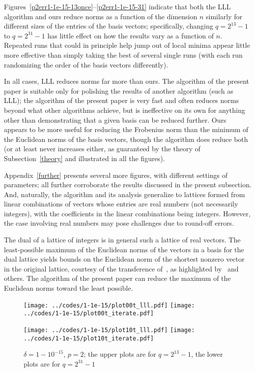 \documentclass{article}
\begin{document}
Figures~\ref{p2err1-1e-15-13once}--\ref{p2err1-1e-15-31}
indicate that both the LLL algorithm and ours reduce norms
as a function of the dimension $n$ similarly for different sizes
of the entries of the basis vectors; specifically, changing $q = 2^{13} - 1$
to $q = 2^{31} - 1$ has little effect on how the results vary
as a function of $n$. Repeated runs that could in principle help jump out
of local minima appear little more effective than simply taking the best
of several single runs (with each run randomizing the order
of the basis vectors differently).

In all cases, LLL reduces norms far more than ours.
The algorithm of the present paper is suitable only for polishing the results
of another algorithm (such as LLL); the algorithm of the present paper
is very fast and often reduces norms beyond what other algorithms achieve,
but is ineffective on its own for anything other than demonstrating
that a given basis can be reduced further.
Ours appears to be more useful for reducing the Frobenius norm
than the minimum of the Euclidean norms of the basis vectors,
though the algorithm does reduce both (or at least never increases either,
as guaranteed by the theory of Subsection~\ref{theory}
and illustrated in all the figures).

Appendix~\ref{further} presents several more figures, with different settings
of parameters; all further corroborate the results discussed
in the present subsection.
And, naturally, the algorithm and its analysis generalize to lattices formed
from linear combinations of vectors whose entries are real numbers
(not necessarily integers), with the coefficients in the linear combinations
being integers. However, the case involving real numbers may pose challenges
due to round-off errors.

The dual of a lattice of integers is in general such a lattice
of real vectors. The least-possible maximum of the Euclidean norms
of the vectors in a basis for the dual lattice yields bounds
on the Euclidean norm of the shortest nonzero vector in the original lattice,
courtesy of the transference of~\cite{banaszczyk},
as highlighted by~\cite{regev} and others.
The algorithm of the present paper can reduce the maximum
of the Euclidean norms toward the least possible.

\begin{figure}
\begin{centering}
{\texttt{[image: ../codes/1-1e-15/plot00t\_lll.pdf]}}
{\texttt{[image: ../codes/1-1e-15/plot00t\_iterate.pdf]}}

{\texttt{[image: ../codes/1-1e-15/plot10t\_lll.pdf]}}
{\texttt{[image: ../codes/1-1e-15/plot10t\_iterate.pdf]}}

\end{centering}
\caption{$\delta = 1-10^{-15}$, $p = 2$;
         the upper plots are for $q = 2^{13} - 1$,
         the lower plots are for $q = 2^{31} - 1$}
\label{p2time1-1e-15}
\end{figure}
\end{document}
